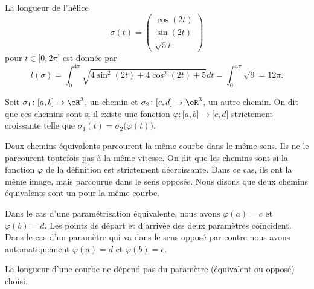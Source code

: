\begin{example}
    La longueur de l'hélice
    \begin{equation}
        \sigma(t)=\begin{pmatrix}
            \cos(2t)    \\ 
            \sin(2t)    \\ 
            \sqrt{5}t    
        \end{pmatrix}
    \end{equation}
    pour $t\in\mathopen[ 0 , 2\pi \mathclose]$ est donnée par
    \begin{equation}
        l(\sigma)=\int_0^{4\pi}\sqrt{4\sin^2(2t)+4\cos^2(2t)+5}dt=\int_0^{4\pi}\sqrt{9}=12\pi.
    \end{equation}
\end{example}

\begin{definition}
    Soit $\sigma_1\colon \mathopen[ a , b \mathclose]\to \eR^3$, un chemin et $\sigma_2\colon \mathopen[ c , d \mathclose]\to \eR^3$, un autre chemin. On dit que ces chemins sont  si il existe une fonction $\varphi\colon \mathopen[ a , b \mathclose]\to \mathopen[ c , d \mathclose]$ strictement croissante telle que $\sigma_1(t)=\sigma_2\big( \varphi(t) \big)$.
\end{definition}

Deux chemins équivalents parcourent la même courbe dans le même sens. Ils ne le parcourent toutefois pas à la même vitesse. On dit que les chemins sont  si la fonction $\varphi$ de la définition est strictement décroissante. Dans ce cas, ils ont la même image, mais parcourue dans le sens opposés. Nous disons que deux chemins équivalents sont un  pour la même courbe.

 Dans le cas d'une paramétrisation équivalente, nous avons $\varphi(a)=c$ et $\varphi(b)=d$. Les points de départ et d'arrivée des deux paramètres coïncident. Dans le cas d'un paramètre qui va dans le sens opposé par contre nous avons automatiquement $\varphi(a)=d$ et $\varphi(b)=c$.

\begin{proposition}
    La longueur d'une courbe ne dépend pas du paramètre (équivalent ou opposé) choisi.
\end{proposition}

